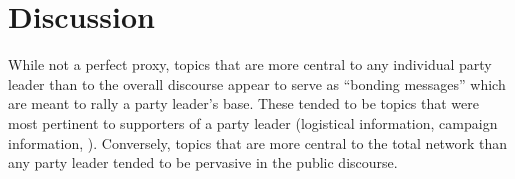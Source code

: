 \section{Discussion}

While not a perfect proxy, topics that are more central to any individual party
leader than to the overall discourse appear to serve as ``bonding messages''
which are meant to rally a party leader's base. These tended to be topics that
were most pertinent to supporters of a party leader (logistical information,
campaign information, \etc). Conversely, topics that are more central to the
total network than any party leader tended to be pervasive in the public
discourse. 





\label{lastpage}



